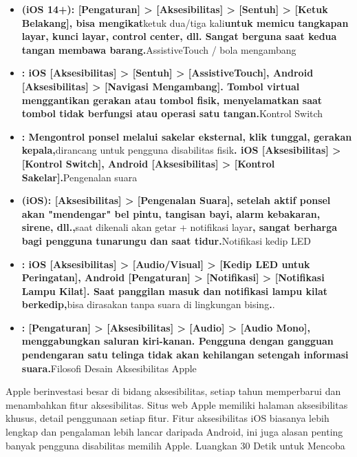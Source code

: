 
\begin{itemize}
  \item \textbf{(iOS 14+): [Pengaturan] > [Aksesibilitas] > [Sentuh] > [Ketuk Belakang], bisa mengikat}ketuk dua/tiga kali\textbf{untuk memicu tangkapan layar, kunci layar, control center, dll. Sangat berguna saat kedua tangan membawa barang.}AssistiveTouch / bola mengambang
  \item \textbf{: iOS [Aksesibilitas] > [Sentuh] > [AssistiveTouch], Android [Aksesibilitas] > [Navigasi Mengambang]. Tombol virtual menggantikan gerakan atau tombol fisik, menyelamatkan saat tombol tidak berfungsi atau operasi satu tangan.}Kontrol Switch
  \item \textbf{: Mengontrol ponsel melalui sakelar eksternal, klik tunggal, gerakan kepala,}dirancang untuk pengguna disabilitas fisik\textbf{. iOS [Aksesibilitas] > [Kontrol Switch], Android [Aksesibilitas] > [Kontrol Sakelar].}Pengenalan suara
  \item \textbf{(iOS): [Aksesibilitas] > [Pengenalan Suara], setelah aktif ponsel akan "mendengar" bel pintu, tangisan bayi, alarm kebakaran, sirene, dll.,}saat dikenali akan getar + notifikasi layar\textbf{, sangat berharga bagi pengguna tunarungu dan saat tidur.}Notifikasi kedip LED
  \item \textbf{: iOS [Aksesibilitas] > [Audio/Visual] > [Kedip LED untuk Peringatan], Android [Pengaturan] > [Notifikasi] > [Notifikasi Lampu Kilat]. Saat panggilan masuk dan notifikasi lampu kilat berkedip,}bisa dirasakan tanpa suara di lingkungan bising\textbf{.}.
  \item \textbf{: [Pengaturan] > [Aksesibilitas] > [Audio] > [Audio Mono], menggabungkan saluran kiri-kanan. Pengguna dengan gangguan pendengaran satu telinga tidak akan kehilangan setengah informasi suara.}Filosofi Desain Aksesibilitas Apple
\end{itemize}

\begin{tcbinfo}{Apple berinvestasi besar di bidang aksesibilitas, setiap tahun memperbarui dan menambahkan fitur aksesibilitas. Situs web Apple memiliki halaman aksesibilitas khusus, detail penggunaan setiap fitur. Fitur aksesibilitas iOS biasanya lebih lengkap dan pengalaman lebih lancar daripada Android, ini juga alasan penting banyak pengguna disabilitas memilih Apple.}
Luangkan 30 Detik untuk Mencoba

\end{tcbinfo}


